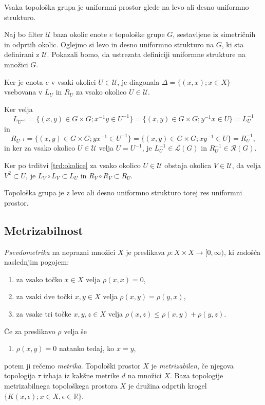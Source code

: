 \documentclass[mat1]{fmfdelo}
\newcommand{\R}{\mathbb R}
\newcommand{\Ucurl}{\mathcal{U}}
\begin{document}
\begin{trditev}\label{trd:topguniform}
	Vsaka topološka grupa je uniformni prostor glede na levo ali desno uniformno strukturo.
\end{trditev}

\begin{dokaz}
Naj bo filter $\Ucurl$ baza okolic enote $e$ topološke grupe $G$, sestavljene iz simetričnih in odprtih okolic. Oglejmo si levo in desno uniformno strukturo na $G$, ki sta definirani z $\Ucurl$. Pokazali bomo, da ustrezata definiciji uniformne strukture na množici $G$.

Ker je enota $e$ v vsaki okolici $U \in \Ucurl$, je diagonala $\Delta = \lbrace (x, x) ; x \in X \rbrace$ vsebovana v $L_U$ in $R_U$ za vsako okolico $U \in \Ucurl$.

Ker velja \[L_{U^{-1}} = \lbrace (x, y) \in G \times G ; x^{-1}y \in U^{-1} \rbrace = \lbrace (x, y) \in G \times G ; y^{-1}x \in U \rbrace = L^{-1}_U\]
in
\[R_{U^{-1}} = \lbrace (x, y) \in G \times G ; yx^{-1} \in U^{-1} \rbrace = \lbrace (x, y) \in G \times G ; xy^{-1} \in U \rbrace = R^{-1}_U,\]
in ker za vsako okolico $U \in \Ucurl$ velja $U = U^{-1}$, je $L^{-1}_U \in \mathcal{L}(G)$ in $R^{-1}_U \in \mathcal{R}(G)$.

Ker po trditvi \ref{trd:okolice} za vsako okolico $U \in \Ucurl$ obstaja okolica $V \in \Ucurl$, da velja $V^2 \subset U$, je $L_V \circ L_V \subset L_U$ in $R_V \circ R_V \subset R_U$.

Topološka grupa je z levo ali desno uniformno strukturo torej res uniformni prostor.
\end{dokaz}

\subsection{Metrizabilnost}
\emph{Psevdometrika} na neprazni množici $X$ je preslikava $\rho\colon X\times X \to  [0, \infty)$, ki zadošča naslednjim pogojem:
\begin{enumerate}
\item za vsako točko $x \in X$ velja $\rho (x, x) = 0$,
\item za vsaki dve točki $x, y \in X$ velja $\rho (x, y) = \rho (y, x)$,
\item za vsake tri točke $x, y, z \in X$ velja $\rho (x, z) \leq \rho (x, y) + \rho (y, z)$.
\end{enumerate}
Če za preslikavo $\rho$ velja še
\begin{enumerate}[resume]
\item $\rho(x,y) = 0$ natanko tedaj, ko $x = y$,
\end{enumerate}
potem ji rečemo \emph{metrika}.
Topološki prostor $X$ je \emph{metrizabilen}, če njegova topologija $\tau$ izhaja iz kakšne metrike $d$ na množici $X$.
Baza topologije metrizabilnega topološkega prostora $X$ je družina odprtih krogel $\lbrace K(x, \epsilon); x \in X, \epsilon \in \R \rbrace$.
\end{document}
